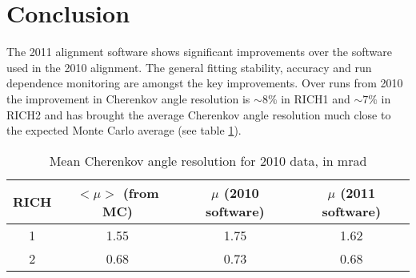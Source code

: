 \section{Conclusion}
The 2011 alignment software shows significant improvements over the software used in the 2010 alignment. The general fitting stability, accuracy and run dependence monitoring are amongst the key improvements. Over runs from 2010 the improvement in Cherenkov angle resolution is $\sim8\%$ in RICH1 and  $\sim7\%$ in RICH2 and has brought the average Cherenkov angle resolution much close to the expected Monte Carlo average (see table \ref{tab:mean Cherenkov angle resolution 2010 data}). \newline

\begin{table}[htdp]
	\begin{center}
		\caption{Mean Cherenkov angle resolution for 2010 data, in mrad}
		\begin{tabular}{|c|c|c|c|}
			\hline
			RICH & $<\mu>$ (from MC) & $\mu$ (2010 software) & $\mu$ (2011 software) \\
			\hline
			1 & 1.55 & 1.75 & 1.62 \\
			2 & 0.68 & 0.73 & 0.68 \\
			\hline
		\end{tabular}
		\label{tab:mean Cherenkov angle resolution 2010 data}
	\end{center}
\end{table}